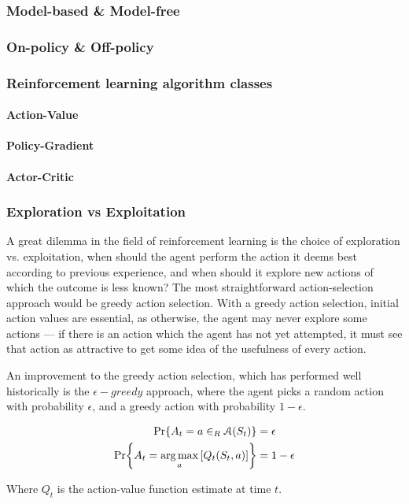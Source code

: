 \subsubsection{Model-based \& Model-free}

\subsubsection{On-policy \& Off-policy}

\subsubsection{Reinforcement learning algorithm classes}
\paragraph{Action-Value}
\paragraph{Policy-Gradient}
\paragraph{Actor-Critic}

\subsubsection{Exploration vs Exploitation}
A great dilemma in the field of reinforcement learning is the choice of exploration vs. exploitation, when should the agent perform the action it deems best according to previous experience, and when should it explore new actions of which the outcome is less known? 
The most straightforward action-selection approach would be greedy action selection. With a greedy action selection, initial action values are essential, as otherwise, the agent may never explore some actions --- if there is an action which the agent has not yet attempted, it must see that action as attractive to get some idea of the usefulness of every action. 

An improvement to the greedy action selection, which has performed well historically is the $\epsilon-greedy$ approach, where the agent picks a random action with probability $\epsilon$, and a greedy action with probability $1-\epsilon$.

\begin{align}
    {{\rm Pr\!}\left\{A_t = a \in_R \ensuremath{\mathcal{A}}(S_t)\right\}} &= \epsilon\\
    {{\rm Pr\!}\left\{A_t = \operatorname*{arg\,max}_a \left[Q_t(S_t,a)\right]\right\}} &= 1-\epsilon
\end{align}

Where $Q_t$ is the action-value function estimate at time $t$.